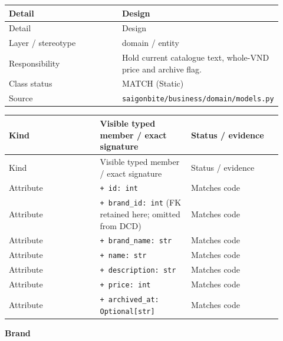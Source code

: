 \begin{longtable}{>{\raggedright\arraybackslash}p{0.4600\linewidth}>{\raggedright\arraybackslash}p{0.4600\linewidth}}
Detail & Design \\
\hline\endfirsthead
Detail & Design \\
\hline\endhead
Layer / stereotype & domain / \guillemotleft{}entity\guillemotright{} \\
Responsibility & Hold current catalogue text, whole-VND price and archive flag. \\
Class status & MATCH (Static) \\
Source & \texttt{saigonbite/\allowbreak{}business/\allowbreak{}domain/\allowbreak{}models.\allowbreak{}py} \\
\end{longtable}
\begin{longtable}{>{\raggedright\arraybackslash}p{0.3067\linewidth}>{\raggedright\arraybackslash}p{0.3067\linewidth}>{\raggedright\arraybackslash}p{0.3067\linewidth}}
Kind & Visible typed member / exact signature & Status / evidence \\
\hline\endfirsthead
Kind & Visible typed member / exact signature & Status / evidence \\
\hline\endhead
Attribute & \texttt{+ id: int} & Matches code \\
Attribute & \texttt{+ brand\_\allowbreak{}id: int} (FK retained here; omitted from DCD) & Matches code \\
Attribute & \texttt{+ brand\_\allowbreak{}name: str} & Matches code \\
Attribute & \texttt{+ name: str} & Matches code \\
Attribute & \texttt{+ description: str} & Matches code \\
Attribute & \texttt{+ price: int} & Matches code \\
Attribute & \texttt{+ archived\_\allowbreak{}at: Optional[str]} & Matches code \\
\end{longtable}
\textbf{Brand}

